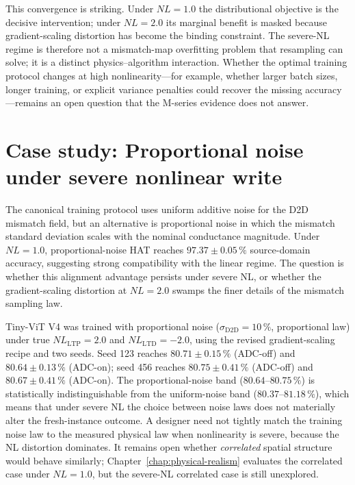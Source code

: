 This convergence is striking.  Under $NL=1.0$ the distributional objective is the decisive intervention; under $NL=2.0$ its marginal benefit is masked because gradient-scaling distortion has become the binding constraint.  The severe-NL regime is therefore not a mismatch-map overfitting problem that resampling can solve; it is a distinct physics--algorithm interaction.  Whether the optimal training protocol changes at high nonlinearity---for example, whether larger batch sizes, longer training, or explicit variance penalties could recover the missing accuracy---remains an open question that the M-series evidence does not answer.


\section{Case study: Proportional noise under severe nonlinear write}
\label{sec:case-severe-nl-proportional}

The canonical training protocol uses uniform additive noise for the D2D mismatch field, but an alternative is proportional noise in which the mismatch standard deviation scales with the nominal conductance magnitude.  Under $NL=1.0$, proportional-noise HAT reaches $97.37\pm0.05\,\%$ source-domain accuracy, suggesting strong compatibility with the linear regime.  The question is whether this alignment advantage persists under severe NL, or whether the gradient-scaling distortion at $NL=2.0$ swamps the finer details of the mismatch sampling law.

Tiny-ViT V4 was trained with proportional noise ($\sigma_{\mathrm{D2D}}=10\,\%$, proportional law) under true $NL_{\mathrm{LTP}}=2.0$ and $NL_{\mathrm{LTD}}=-2.0$, using the revised gradient-scaling recipe and two seeds.  Seed 123 reaches $80.71\pm0.15\,\%$ (ADC-off) and $80.64\pm0.13\,\%$ (ADC-on); seed 456 reaches $80.75\pm0.41\,\%$ (ADC-off) and $80.67\pm0.41\,\%$ (ADC-on).  The proportional-noise band ($80.64$--$80.75\,\%$) is statistically indistinguishable from the uniform-noise band ($80.37$--$81.18\,\%$), which means that under severe NL the choice between noise laws does not materially alter the fresh-instance outcome.  A designer need not tightly match the training noise law to the measured physical law when nonlinearity is severe, because the NL distortion dominates.  It remains open whether \emph{correlated} spatial structure would behave similarly; Chapter~\ref{chap:physical-realism} evaluates the correlated case under $NL=1.0$, but the severe-NL correlated case is still unexplored.


